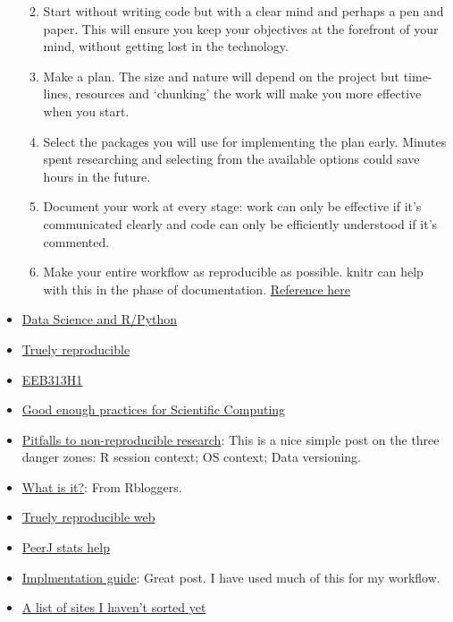 \documentclass[
]{book}
\providecommand{\tightlist}{%
  \setlength{\itemsep}{0pt}\setlength{\parskip}{0pt}}
\theoremstyle{definition}
\theoremstyle{definition}
\theoremstyle{definition}
\theoremstyle{definition}
\theoremstyle{remark}
\begin{document}
\begin{itemize}
  \begin{enumerate}
  \def\labelenumi{\arabic{enumi}.}
  \tightlist
  \item
    Start without writing code but with a clear mind and perhaps a pen and paper. This will ensure you keep your objectives at the forefront of your mind, without getting lost in the technology.
  \item
    Make a plan. The size and nature will depend on the project but time-lines, resources and `chunking' the work will make you more effective when you start.
  \item
    Select the packages you will use for implementing the plan early. Minutes spent researching and selecting from the available options could save hours in the future.
  \item
    Document your work at every stage: work can only be effective if it's communicated clearly and code can only be efficiently understood if it's commented.
  \item
    Make your entire workflow as reproducible as possible. knitr can help with this in the phase of documentation. \href{https://csgillespie.github.io/efficientR/workflow.html}{Reference here}
  \end{enumerate}
\item
  \href{https://community.rstudio.com/t/data-science-project-template-for-r/3230}{Data Science and R/Python}
\item
  \href{https://timogrossenbacher.ch/2017/07/a-truly-reproducible-r-workflow/}{Truely reproducible}
\item
  \href{https://uoftcoders.github.io/rcourse/lec16-rmarkdown.html}{EEB313H1}
\item
  \href{https://swcarpentry.github.io/good-enough-practices-in-scientific-computing/}{Good enough practices for Scientific Computing}
\item
  \href{https://www.r-bloggers.com/reproducible-research-when-your-results-cant-be-reproduced/}{Pitfalls to non-reproducible research}: This is a nice simple post on the three danger zones: R session context; OS context; Data versioning.
\item
  \href{https://www.r-bloggers.com/what-is-reproducible-research/}{What is it?}: From Rbloggers.
\item
  \href{https://www.r-bloggers.com/stencila-an-office-suite-for-reproducible-research/}{Truely reproducible web}
\item
  \href{https://peerj.com/collections/50-practicaldatascistats/}{PeerJ stats help}
\item
  \href{http://blog.jom.link/implementation_basic_reproductible_workflow.html}{Implmentation guide}: Great post. I have used much of this for my workflow.
\item
  \href{https://www.one-tab.com/page/HngnpHOKRpuiqeQEB7_B7A}{A list of sites I haven't sorted yet}
\end{itemize}
\end{document}
